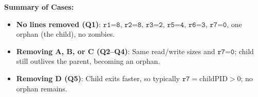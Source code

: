 \documentclass[11pt]{article}
\begin{document}
	\noindent
	\textbf{Summary of Cases:}
	\begin{itemize}
		\item \textbf{No lines removed (Q1)}: \(\texttt{r1=8, r2=8, r3=2, r5=4, r6=3, r7=0}\), one orphan (the child), no zombies.
		\item \textbf{Removing A, B, or C (Q2--Q4)}: Same read/write sizes and \(\texttt{r7=0}\); child still outlives the parent, becoming an orphan.
		\item \textbf{Removing D (Q5)}: Child exits faster, so typically \(\texttt{r7}=\text{childPID}>0\); no orphan remains.
	\end{itemize}
	
	
\end{document}
